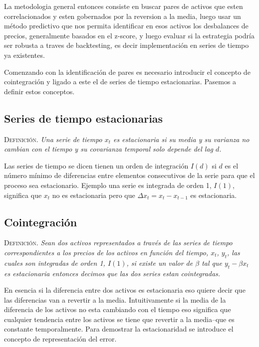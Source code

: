 \documentclass{myarticle}
\begin{document}
La metodologia general entonces consiste en buscar pares de activos que esten correlacionados  y esten gobernados por la reversion a la media, luego usar un m\'etodo predictivo que nos permita identificar en esos activos los desbalances de precios, generalmente basados en el z-score, y luego evaluar si la estrategia podr\'ia ser robusta a traves de backtesting, es decir implementaci\'on en series de tiempo ya existentes.

Comenzando con la identificaci\'on de pares es necesario introducir el concepto de cointegraci\'on y ligado a este el de series de tiempo estacionarias. Pasemos a definir estos conceptos.

\subsection{Series de tiempo estacionarias}
\label{sec:org2946d4f}
{\scshape Definici\'on.} {\em Una serie de tiempo \(x_t\) es estacionaria si su media y su varianza no cambian con el tiempo y su covarianza temporal  solo depende del lag \(d\).}


Las series de tiempo se dicen tienen un orden de integraci\'on \(I(d)\) si \(d\) es el n\'umero m\'inimo de diferencias entre elementos consecutivos de la serie para que el proceso sea estacionario. Ejemplo una serie es integrada de orden 1, \(I(1)\), significa que \(x_t\) no es estacionaria pero que \(\Delta x_t = x_t-x_{t-1}\) es estacionaria.

\subsection{Cointegraci\'on}
\label{sec:org5b2e9bc}

{\scshape Definici\'on.} {\em Sean dos activos representados a trav\'es de las series de tiempo correspondientes a los precios de los activos en funci\'on del tiempo, \(x_t\), \(y_t\), las cuales son integradas de orden 1, \(I(1)\), si existe un valor de \(\beta\) tal que \(y_t-\beta x_t\) es estacionaria entonces decimos que las dos series estan cointegradas.}

En esencia si la diferencia entre dos activos es estacionaria eso quiere decir que las diferencias van a revertir a la media. Intuitivamente si la media de la diferencia de los activos no esta cambiando con el tiempo eso significa que cualquier tendencia entre los activos se tiene que revertir a la media--que es constante temporalmente. Para demostrar la estacionaridad se introduce el concepto de representaci\'on del error.
\end{document}
